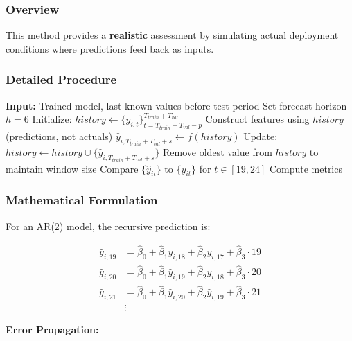 \documentclass[12pt,a4paper]{article}
\begin{document}
\subsubsection{Overview}

This method provides a \textbf{realistic} assessment by simulating actual deployment conditions where predictions feed back as inputs.

\subsubsection{Detailed Procedure}

\begin{algorithm}[H]
\caption{Recursive Multi-Step Evaluation}
\begin{algorithmic}[1]
\State \textbf{Input:} Trained model, last known values before test period
\State Set forecast horizon $h = 6$
    \State Initialize: $history \gets \{y_{i,t}\}_{t=T_{train}+T_{val}-p}^{T_{train}+T_{val}}$
        \State Construct features using $history$ (predictions, not actuals)
        \State $\hat{y}_{i,T_{train}+T_{val}+s} \gets f(history)$
        \State Update: $history \gets history \cup \{\hat{y}_{i,T_{train}+T_{val}+s}\}$
        \State Remove oldest value from $history$ to maintain window size
    \EndFor
\EndFor
\State
\State Compare $\{\hat{y}_{it}\}$ to $\{y_{it}\}$ for $t \in [19, 24]$
\State Compute metrics
\end{algorithmic}
\end{algorithm}

\subsubsection{Mathematical Formulation}

For an AR(2) model, the recursive prediction is:

\begin{align}
\hat{y}_{i,19} &= \hat{\beta}_0 + \hat{\beta}_1 y_{i,18} + \hat{\beta}_2 y_{i,17} + \hat{\beta}_3 \cdot 19 \\
\hat{y}_{i,20} &= \hat{\beta}_0 + \hat{\beta}_1 \hat{y}_{i,19} + \hat{\beta}_2 y_{i,18} + \hat{\beta}_3 \cdot 20 \\
\hat{y}_{i,21} &= \hat{\beta}_0 + \hat{\beta}_1 \hat{y}_{i,20} + \hat{\beta}_2 \hat{y}_{i,19} + \hat{\beta}_3 \cdot 21 \\
&\vdots
\end{align}

\textbf{Error Propagation:}
\end{document}
